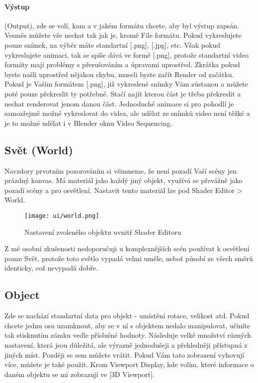 \documentclass[12pt,a4paper]{report}
\begin{document}
	\paragraph{Výstup} (Output), zde se volí, kam a v jakém formátu chcete, aby byl
	výstup zapsán. Vesměs můžete vše nechat tak jak je, kromě File formátu.
	Pokud vykreslujete pouze snímek, na výběr máte standartní [.png],
	[.jpg], etc. Však pokud vykreslujete animaci, tak se spíše dává ve formě
	[.png], protože standartní video formáty mají problémy s přerušováním
	a úpravami uprostřed. Zkrátka pokud byste našli uprostřed nějakou
	chybu, museli byste začít Render od začátku. Pokud je Vaším formátem
	[.png], již vykreslené snímky Vám zůstanou a můžete poté pouze
	překreslit ty potřebné. Stačí najít kterou část je třeba překreslit a nechat
	renderovat jenom danou část. Jednoduché animace si pro pohodlí je
	samozřejmě možné vykreslovat do videa, ale udělat ze snímků video není
	těžké a je to možné udělat i v Blender oknu Video Sequencing.
	
	\subsection{Svět (World)}
	Navzdory prvotním pozorováním si všimneme, že není pozadí Vaší scény
	jen prázdný kanvas. Má materiál jako každý jiný objekt, využívá se
	převážně jako pozadí scény a pro osvětlení.
	Nastavit tento materiál lze pod Shader Editor > World.
	
	\begin{figure}[h]
		\centering
		\texttt{[image: ui/world.png]}
		\caption{Nastavení zvoleného objektu uvnitř Shader Editoru}
		\label{pic:world}
	\end{figure}
	
	Z mé osobní zkušenosti nedoporučuji u komplexnějších scén používat
	k osvětlení pouze Svět, protože toto světlo vypadá velmi uměle, neboť
	působí ze všech směrů identicky, což nevypadá dobře.
	
	\subsection{Object}
	Zde se nachází standartní data pro objekt - umístění rotace, velikost atd.
	Pokud chcete jednu osu uzamknout, aby se v ní s objektem nedalo
	manipulovat, učiníte tak stisknutím zámku vedle příslušné hodnoty.
	Následuje velké množství různých nastavení, která jsou důležitá, ale
	výrazně jednodušeji a přehledněji přístupná z jiných míst. Později se sem
	můžete vrátit. Pokud Vám tato zobrazení vyhovují více, můžete je také
	použít.
	Krom Viewport Display, kde volím, které informace o daném objektu se
	mi zobrazují ve [3D Viewport].
	
\end{document}
